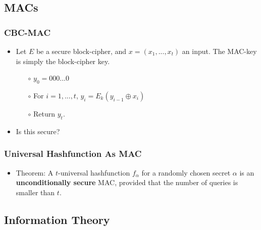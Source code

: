 \documentclass[a4paper]{scrartcl}
\begin{document}
\subsection*{MACs}

\subsubsection*{CBC-MAC}

\begin{itemize}
\item Let $E$ be a secure block-cipher, and $x = (x_1,...,x_t)$ an input. The MAC-key is simply the block-cipher key.
\begin{itemize}
\item [$\circ$] $y_0 = 000...0$
\item [$\circ$] For $i=1,...,t$, $y_i = E_k(y_{i-1}\oplus x_i)$
\item [$\circ$] Return $y_t$.
\end{itemize}
\item Is this secure?
\end{itemize}

\subsubsection*{Universal Hashfunction As MAC}
\begin{itemize}
\item Theorem: A $t$-universal hashfunction $f_\alpha$ for a randomly chosen secret $\alpha$ is an \textbf{unconditionally secure} MAC, provided that the number of queries is smaller than $t$.
\end{itemize}

\subsection*{Information Theory}
\end{document}
